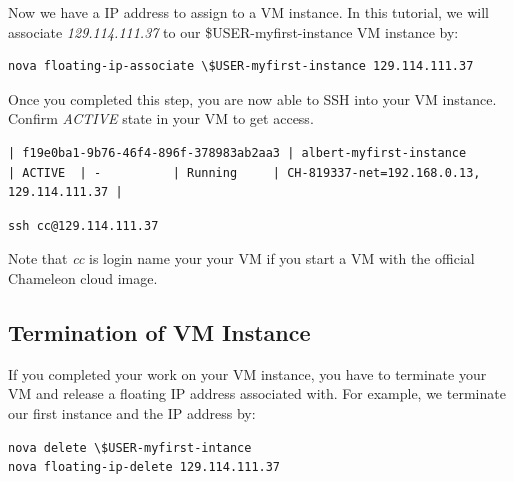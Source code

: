 Now we have a IP address to assign to a VM instance. In this tutorial, we will
associate \textit{129.114.111.37} to our \$USER-myfirst-instance VM instance by:

\begin{lstlisting}
nova floating-ip-associate \$USER-myfirst-instance 129.114.111.37
\end{lstlisting}

Once you completed this step, you are now able to SSH into your VM instance.
Confirm \textit{ACTIVE} state in your VM to get access.

\begin{lstlisting}
| f19e0ba1-9b76-46f4-896f-378983ab2aa3 | albert-myfirst-instance       | ACTIVE  | -          | Running     | CH-819337-net=192.168.0.13, 129.114.111.37 |
\end{lstlisting}


\begin{lstlisting}
ssh cc@129.114.111.37
\end{lstlisting}

Note that \textit{cc} is login name your your VM if you start a VM with the
official Chameleon cloud image. 

\subsection{Termination of VM Instance}
If you completed your work on your VM instance, you have to terminate your VM
and release a floating IP address associated with. For example, we terminate
our first instance and the IP address by:

\begin{lstlisting}
nova delete \$USER-myfirst-intance
nova floating-ip-delete 129.114.111.37
\end{lstlisting}


